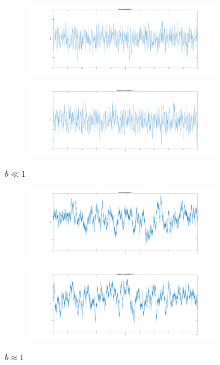 \documentclass[12pt]{article}
\begin{document}
\begin{enumerate}
		\begin{figure}
			\centering
			\begin{subfigure}[b]{0.8\textwidth}
				\centering
				\includegraphics[width=0.9\textwidth]{fig1.png}
			\end{subfigure}
			\begin{subfigure}[b]{0.8\textwidth}
				\centering
				\includegraphics[width=0.9\textwidth]{fig2.png}
			\end{subfigure}
			\caption{$b\ll1$}
		\end{figure}
	
		\begin{figure}
			\centering
			\begin{subfigure}[b]{0.8\textwidth}
				\centering
				\includegraphics[width=0.9\textwidth]{fig1_b.png}
			\end{subfigure}
			\begin{subfigure}[b]{0.8\textwidth}
				\centering
				\includegraphics[width=0.9\textwidth]{fig2_b.png}
			\end{subfigure}
			\caption{$b\approx1$}
		\end{figure}
	

\end{enumerate}
\end{document}
